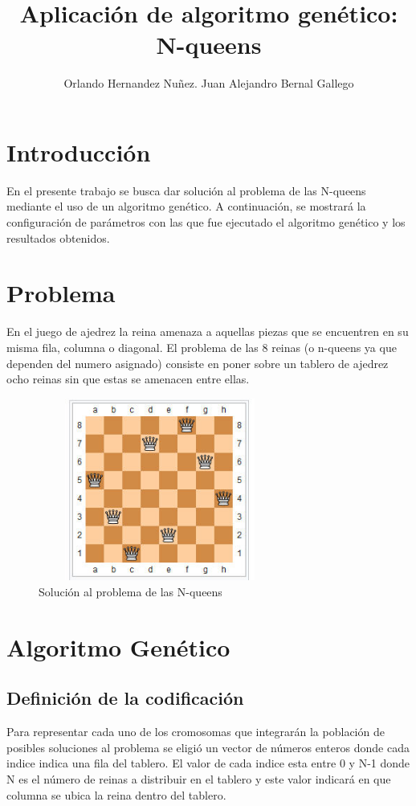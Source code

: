 \documentclass[11pt]{article}
\begin{document}
\title{Aplicaci\'on de algoritmo gen\'etico: N-queens }
\author{Orlando Hernandez Nu\~nez. Juan Alejandro Bernal Gallego}
\maketitle

\section{Introducci\'on}
En el presente trabajo se busca dar soluci\'on al problema de las N-queens mediante el uso de un algoritmo gen\'etico. A continuaci\'on, se mostrar\'a la configuraci\'on de par\'ametros con las que fue ejecutado el algoritmo gen\'etico y los resultados obtenidos.

\section{Problema}
En el juego de ajedrez la reina amenaza a aquellas piezas que se encuentren en su misma fila, columna o diagonal. El problema de las 8 reinas (o n-queens ya que dependen del numero asignado) consiste en poner sobre un tablero de ajedrez ocho reinas sin que estas se amenacen entre ellas.
\begin{figure}[h]
\includegraphics[width=8cm, height=6cm]{nqueens}
\centering
\caption{Soluci\'on al problema de las N-queens}
\end{figure}
\section{Algoritmo Gen\'etico}
\subsection{Definici\'on de la codificaci\'on}
Para representar cada uno de los cromosomas que integrar\'an la poblaci\'on de posibles soluciones
al problema se eligi\'o un vector de n\'umeros enteros donde cada indice indica una fila del tablero.
El valor de cada indice esta entre 0 y N-1 donde N es el n\'umero de reinas a distribuir en el tablero
y este valor indicar\'a en que columna se ubica la reina dentro del tablero.
\end{document}
